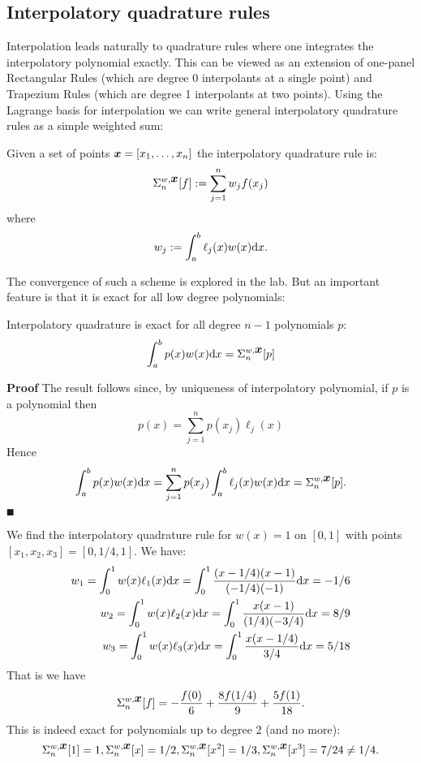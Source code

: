 \subsection{Interpolatory quadrature rules}
Interpolation leads naturally to quadrature rules where one integrates the interpolatory polynomial exactly. This can be viewed as an extension of one-panel Rectangular Rules (which are degree 0 interpolants at a single point) and Trapezium Rules (which are degree 1 interpolants at two points).  Using the Lagrange basis for interpolation we can write general interpolatory quadrature rules as a simple weighted sum:

\begin{definition} Given a set of points $\bm{{\mbox{\boldmath$x$\unboldmath}}} = [x_1,\ldots,x_n]$ the interpolatory quadrature rule is:
\[
\Sigma_n^{w,\bm{{\mbox{\boldmath$x$\unboldmath}}}}[f] := \sum_{j=1}^n w_j f(x_j)
\]
where
\[
w_j := \ensuremath{\int}_a^b \ensuremath{\ell}_j(x) w(x) {\rm d} x.
\]
\end{definition}

The convergence of such a scheme is explored in the lab. But an important feature is that it is exact for all low degree polynomials:

\begin{proposition}  Interpolatory quadrature is exact for all degree $n-1$ polynomials $p$:
\[
\int_a^b p(x) w(x) {\rm d}x = \Sigma_n^{w,\bm{{\mbox{\boldmath$x$\unboldmath}}}}[p]
\]
\end{proposition}
\textbf{Proof} The result follows since, by uniqueness of interpolatory polynomial, if $p$ is a polynomial then
\[
p(x) = \ensuremath{\sum}_{j=1}^n p(x_j) \ensuremath{\ell}_j(x)
\]
Hence
\[
\int_a^b p(x) w(x) {\rm d}x = \sum_{j=1}^n p(x_j) \int_a^b \ell_j(x) w(x) {\rm d}x = \Sigma_n^{w,\bm{{\mbox{\boldmath$x$\unboldmath}}}}[p].
\]
\ensuremath{\QED}

\begin{example} We find the interpolatory quadrature rule for $w(x) = 1$ on $[0,1]$ with  points $[x_1,x_2,x_3] = [0,1/4,1]$. We have:
\begin{align*}
w_1 = \int_0^1 w(x) \ensuremath{\ell}_1(x) {\rm d}x  = \int_0^1 {(x-1/4)(x-1) \over (-1/4)(-1)}{\rm d}x = -1/6 \\
w_2 = \int_0^1 w(x) \ensuremath{\ell}_2(x) {\rm d}x  = \int_0^1 {x(x-1) \over (1/4)(-3/4)}{\rm d}x = 8/9 \\
w_3 = \int_0^1 w(x) \ensuremath{\ell}_3(x) {\rm d}x  = \int_0^1 {x(x-1/4) \over 3/4}{\rm d}x = 5/18
\end{align*}
That is we have
\[
\Sigma_n^{w,\bm{{\mbox{\boldmath$x$\unboldmath}}}}[f]  = -{f(0) \over 6} + {8f(1/4) \over 9} + {5 f(1) \over 18}.
\]
This is indeed exact for polynomials up to degree $2$ (and no more):
\[
\Sigma_n^{w,\bm{{\mbox{\boldmath$x$\unboldmath}}}}[1] = 1, \Sigma_n^{w,\bm{{\mbox{\boldmath$x$\unboldmath}}}}[x] = 1/2, \Sigma_n^{w,\bm{{\mbox{\boldmath$x$\unboldmath}}}}[x^2] = 1/3, \Sigma_n^{w,\bm{{\mbox{\boldmath$x$\unboldmath}}}}[x^3] = 7/24 \neq 1/4.
\]
\end{example}

